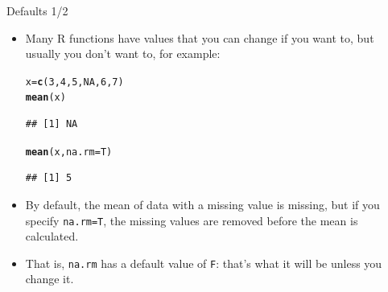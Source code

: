 \documentclass[unknownkeysallowed]{beamer}\usepackage[]{graphicx}\usepackage[]{color}
\makeatletter
\newcommand{\hlnum}[1]{\textcolor[rgb]{0.686,0.059,0.569}{#1}}%
\newcommand{\hlstd}[1]{\textcolor[rgb]{0.345,0.345,0.345}{#1}}%
\newcommand{\hlkwb}[1]{\textcolor[rgb]{0.69,0.353,0.396}{#1}}%
\newcommand{\hlkwc}[1]{\textcolor[rgb]{0.333,0.667,0.333}{#1}}%
\newcommand{\hlkwd}[1]{\textcolor[rgb]{0.737,0.353,0.396}{\textbf{#1}}}%
\newenvironment{kframe}{%
 \def\at@end@of@kframe{}%
 \ifinner\ifhmode%
  \def\at@end@of@kframe{\end{minipage}}%
  \begin{minipage}{\columnwidth}%
 \fi\fi%
 \def\FrameCommand##1{\hskip\@totalleftmargin \hskip-\fboxsep
 \colorbox{shadecolor}{##1}\hskip-\fboxsep
     \hskip-\linewidth \hskip-\@totalleftmargin \hskip\columnwidth}%
 \MakeFramed {\advance\hsize-\width
   \@totalleftmargin\z@ \linewidth\hsize
   \@setminipage}}%
 {\par\unskip\endMakeFramed%
 \at@end@of@kframe}
\newenvironment{knitrout}{}{} %
\makeatother
\begin{document}
\begin{frame}[fragile]{Defaults 1/2}
  
  \begin{itemize}
  \item Many R functions have values that you can change if you want
    to, but usually you don't want to, for example:
    
\begin{knitrout}
\color{fgcolor}\begin{kframe}
\begin{alltt}
\hlstd{x}\hlkwb{=}\hlkwd{c}\hlstd{(}\hlnum{3}\hlstd{,}\hlnum{4}\hlstd{,}\hlnum{5}\hlstd{,}\hlnum{NA}\hlstd{,}\hlnum{6}\hlstd{,}\hlnum{7}\hlstd{)}
\hlkwd{mean}\hlstd{(x)}
\end{alltt}
\begin{verbatim}
## [1] NA
\end{verbatim}
\begin{alltt}
\hlkwd{mean}\hlstd{(x,}\hlkwc{na.rm}\hlstd{=T)}
\end{alltt}
\begin{verbatim}
## [1] 5
\end{verbatim}
\end{kframe}
\end{knitrout}
\item By default, the mean of data with a missing value is missing,
  but if you specify \texttt{na.rm=T}, the missing values are removed
  before the mean is calculated. 
\item That is, \texttt{na.rm} has a default value of \texttt{F}:
  that's what it will be unless you change it.
  \end{itemize}
  
\end{frame}
\end{document}
